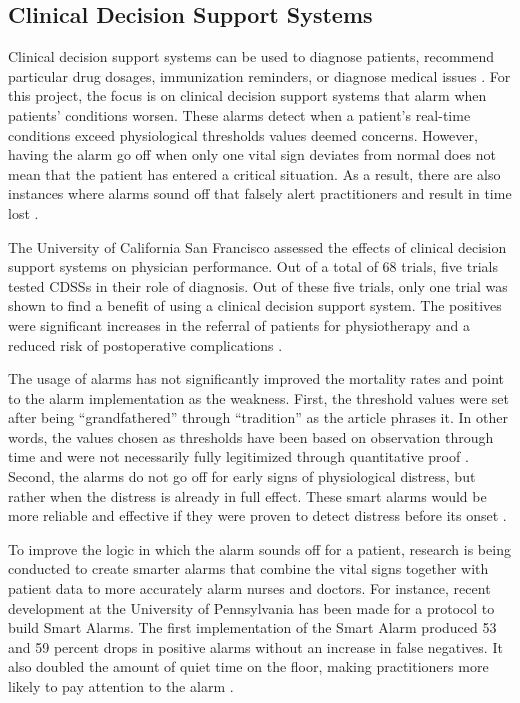 \documentclass{sig-alternate}
\begin{document}
\vspace{10pt}
\subsection{Clinical Decision Support Systems}
\label{subsec:cdss}
\vspace{10pt}

Clinical decision support systems can be used to diagnose patients, recommend particular drug dosages, immunization reminders, or diagnose medical issues \cite{cdss}. For this project, the focus is on clinical decision support systems that alarm when patients' conditions worsen. These alarms detect when a patient's real-time conditions exceed physiological thresholds values deemed concerns. However, having the alarm go off when only one vital sign deviates from normal does not mean that the patient has entered a critical situation. As a result, there are also instances where alarms sound off that falsely alert practitioners and result in time lost \cite{deaths}.

The University of California San Francisco assessed the effects of clinical decision support systems on physician performance. Out of a total of 68 trials, five trials tested CDSSs in their role of diagnosis. Out of these five trials, only one trial was shown to find a benefit of using a clinical decision support system. The positives were significant increases in the referral of patients for physiotherapy and a reduced risk of postoperative complications \cite{cdss}. 

The usage of alarms has not significantly improved the mortality rates and point to the alarm implementation as the weakness. First, the threshold values were set after being ``grandfathered'' through ``tradition'' as the article phrases it. In other words, the values chosen as thresholds have been based on observation through time and were not necessarily fully legitimized through quantitative proof \cite{deaths}. Second, the alarms do not go off for early signs of physiological distress, but rather when the distress is already in full effect. These smart alarms would be more reliable and effective if they were proven to detect distress before its onset \cite{deaths}.  

To improve the logic in which the alarm sounds off for a patient, research is being conducted to create smarter alarms that combine the vital signs together with patient data to more accurately alarm nurses and doctors. For instance, recent development at the University of Pennsylvania has been made for a protocol to build Smart Alarms. The first implementation of the Smart Alarm produced 53 and 59 percent drops in positive alarms without an increase in false negatives. It also doubled the amount of quiet time on the floor, making practitioners more likely to pay attention to the alarm \cite{smart_alarm}.
\end{document}
